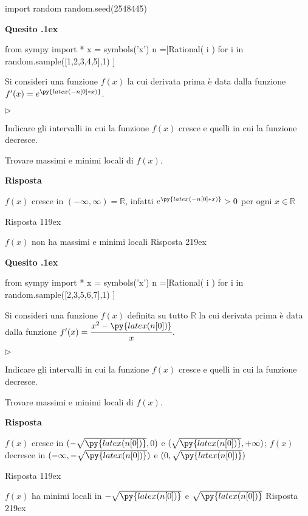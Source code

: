 \documentclass[11pt,twoside,a4paper]{article}
\newcommand{\mylabel}[1]{#1\hfill}
\renewenvironment{itemize}
  {\begin{list}{$\triangleright$}{%
   \setlength{\parskip}{0mm}
   \setlength{\topsep}{.4\baselineskip}
   \setlength{\rightmargin}{0mm}
   \setlength{\listparindent}{0mm}
   \setlength{\itemindent}{0mm}
   \setlength{\labelwidth}{2ex}
   \setlength{\itemsep}{.4\baselineskip}
   \setlength{\parsep}{0mm}
   \setlength{\partopsep}{0mm}
   \setlength{\labelsep}{1ex}
   \setlength{\leftmargin}{\labelwidth+\labelsep}
   \let\makelabel\mylabel}}{%
   \end{list}\vspace*{-1.3mm}}
\newcounter{quesito}
\newenvironment{question}{\bigskip\addtocounter{quesito}{1}\bigskip\bigskip\par\textbf{Quesito \thequesito.\kern1ex}}{\vspace{\parskip}}
\newenvironment{answer}{\par\textbf{Risposta\quad}}{\vspace{\parskip}}
\begin{document}
\begin{pycode}
import random
random.seed(2548445)
\end{pycode}
\begin{question}
\def\RR{{\mathds R}}
\begin{pycode}
from sympy import *
x = symbols('x')
n =[Rational( i ) for i in random.sample([1,2,3,4,5],1) ]
\end{pycode}
Si consideri una funzione $f(x)$ la cui derivata prima è data dalla funzione $f'(x) = e^{\py{latex(-n[0]*x)}}$.
\begin{itemize}
\item[1.] Indicare gli intervalli in cui la funzione $f(x)$ cresce e quelli in cui la funzione decresce.
\item[2.] Trovare massimi e minimi locali di $f(x)$.
\end{itemize}
\begin{answer}

{\color{blue}
$f(x)$ cresce in $(-\infty, \infty) = \RR$}, infatti $e^{\py{latex(-n[0]*x)}} > 0$ per ogni $x \in \RR$

{\color{blue}
\hfill Risposta 1\kern19ex}

{\color{blue}
$f(x)$ non ha massimi e minimi locali
\hfill Risposta 2\kern19ex}

\end{answer}
\end{question}
\begin{question}
\def\RR{{\mathds R}}
\begin{pycode}
from sympy import *
x = symbols('x')
n =[Rational( i ) for i in random.sample([2,3,5,6,7],1) ]
\end{pycode}
Si consideri una funzione $f(x)$ definita su tutto $\RR$ la cui derivata prima è data dalla funzione $f'(x) = \cfrac{x^2 - \py{latex(n[0])}}{x}$.
\begin{itemize}
\item[1.] Indicare gli intervalli in cui la funzione $f(x)$ cresce e quelli in cui la funzione decresce.
\item[2.] Trovare massimi e minimi locali di $f(x)$.
\end{itemize}
\begin{answer}

{\color{blue}
$f(x)$ cresce in $(-\sqrt{\py{latex(n[0])}}, 0)$ e $(\sqrt{\py{latex(n[0])}}, +\infty)$; $f(x)$ decresce in $(-\infty, -\sqrt{\py{latex(n[0])}})$ e $(0, \sqrt{\py{latex(n[0])}})$}

{\color{blue}
\hfill Risposta 1\kern19ex}

{\color{blue}
$f(x)$ ha minimi locali in $-\sqrt{\py{latex(n[0])}}$ e $\sqrt{\py{latex(n[0])}}$
\hfill Risposta 2\kern19ex}

\end{answer}
\end{question}
\end{document}
